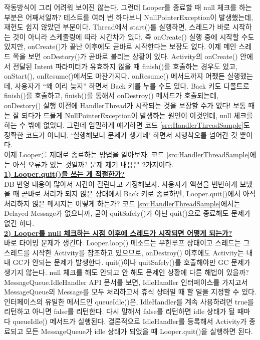작동방식이 그리 어려워 보이진 않는다.
그런데 Looper를 종료할 때 null 체크를 하는 부분은 어째서일까? 
테스트를 여러 번 하다보니 NullPointerException이 발생했는데, 재현도 쉽지 않았던 부분이다. 
Thread에서 start()를 실행하면, 스레드가 바로 시작하는 것이 아니라 스케줄링에 따라 시간차가 있다. 
즉 onCreate() 실행 중에 시작할 수도 있지만, onCreate()가 끝난 이후에도 곧바로 시작한다는 보장도 없다.
이제 메인 스레드 쪽을 보면 onDestory()가 곧바로 불리는 상황이 있다. 
Activity의 onCreate() 안에서 전달된 Intent 파라미터가 유효하지 않을 때 finish()를 호출하는 경우도 있고, onStart(), onResume()에서도 마찬가지다. 
onResume() 메서드까지 어쨌든 실행했는데, 사용자가 ``왜 이리 늦지'' 하면서 Back 키를 누를 수도 있다. Back 키도 디폴트로 finish()를 호출하고, 
finish()를 통해서 onDestroy() 메서드가 호출되는데, onDestory() 실행 이전에 HandlerThread가 시작되는 것을 보장할 수가 없다!
보통 때는 잘 되다가 드물게 NullPointerException이 발생하는 원인이 이것인데, null 체크를 하는 수 밖에 없었다.
그런데 엄밀하게 얘기하면 코드 \ref{src:HandlerThreadSample}도 정확한 코드가 아니다. 
`실행해보니 문제가 생기네' 하면서 시행착오를 넘어간 것 뿐이다.\\

이제 Looper를 제대로 종료하는 방법을 알아보자. 코드 \ref{src:HandlerThreadSample}에는 아직 오류가 있는 것일까?
문제 제기 내용은 2가지이다.\\

\underline{\bfseries 1) Looper.quit()을 쓰는 게 적절한가?}\\
DB 반영 내용이 많아서 시간이 걸린다고 가정해보자. 
사용자가 액션을 빈번하게 보냈을 때 곧바로 처리가 되지 않은 상태에서 Back 키로 종료하면, Looper.quit()에서 아직 처리하지 않은 메시지는 어떻게 하는가?
코드 \ref{src:HandlerThreadSample}에서는 Delayed Message가 없으니까, 굳이 quitSafely()가 아닌 quit()으로 종료해도 문제가 없긴 하다.\\

\underline{\bfseries 2) Looper를 null 체크하는 시점 이후에 스레드가 시작되면 어떻게 되는가?}\\
바로 타이밍 문제가 생긴다. 
Looper.loop() 메소드는 무한루프 상태이고 스레드는 그 스레드를 시작한 Activity를 참조하고 있으므로, onDestroy() 이후에도 Activity는 내내 GC가 안되는 문제가 발생한다.
quit()이나 quitSafely()를 호출해야만 GC 문제가 생기지 않는다.
null 체크를 해도 안되고 안 해도 문제인 상황에 다른 해법이 있을까?\\

MessageQueue.IdleHandler API 문서를 보면, IdleHandler 인터페이스를 가지고서 MessageQueue의 Message를 모두 처리하고서 휴식 상태일 때 할 일을 지정할 수 있다.
인터페이스의 유일한 메서드인 queueIdle()은, IdleHandler를 계속 사용하려면 true를 리턴하고 아니면 false를 리턴한다. 다시 말해서 false를 리턴하면 idle 상태가 될 때마다 queueIdle() 메서드가 실행된다.
결론적으로 IdleHandler를 등록해서 Activity가 종료되고 모든 MessageQueue가 idle 상태가 되었을 때 Looper.quit()을 실행하면 된다.\\

